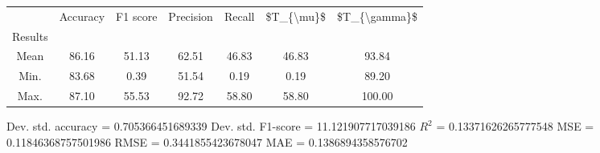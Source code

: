 \begin{tabular}{|c|c|c|c|c|c|c|}
\toprule
{} &  Accuracy &  F1 score &  Precision &  Recall &  \$T\_\{\textbackslash mu\}\$ &  \$T\_\{\textbackslash gamma\}\$ \\
Results &           &           &            &         &            &               \\
\hline
Mean    &     86.16 &     51.13 &      62.51 &   46.83 &      46.83 &         93.84 \\
Min.    &     83.68 &      0.39 &      51.54 &    0.19 &       0.19 &         89.20 \\
Max.    &     87.10 &     55.53 &      92.72 &   58.80 &      58.80 &        100.00 \\
\bottomrule
\end{tabular}

 Dev. std. accuracy = 0.705366451689339
 Dev. std. F1-score = 11.121907717039186
 $R^2$ = 0.13371626265777548
 MSE = 0.11846368757501986
 RMSE = 0.3441855423678047
 MAE = 0.1386894358576702
